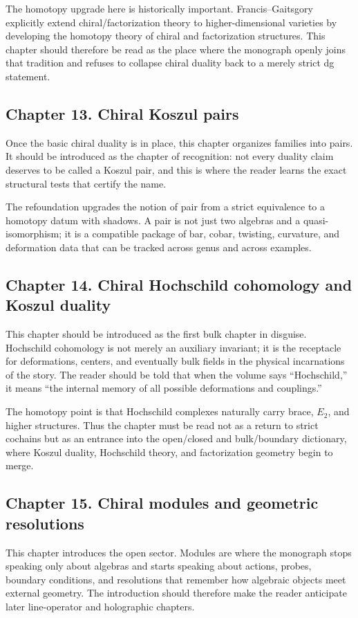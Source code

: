 The homotopy upgrade here is historically important.  Francis--Gaitsgory explicitly extend chiral/factorization theory to higher-dimensional varieties by developing the homotopy theory of chiral and factorization structures.  This chapter should therefore be read as the place where the monograph openly joins that tradition and refuses to collapse chiral duality back to a merely strict dg statement.

\subsection*{Chapter 13. Chiral Koszul pairs}
Once the basic chiral duality is in place, this chapter organizes families into pairs.  It should be introduced as the chapter of recognition: not every duality claim deserves to be called a Koszul pair, and this is where the reader learns the exact structural tests that certify the name.

The refoundation upgrades the notion of pair from a strict equivalence to a homotopy datum with shadows.  A pair is not just two algebras and a quasi-isomorphism; it is a compatible package of bar, cobar, twisting, curvature, and deformation data that can be tracked across genus and across examples.

\subsection*{Chapter 14. Chiral Hochschild cohomology and Koszul duality}
This chapter should be introduced as the first bulk chapter in disguise.  Hochschild cohomology is not merely an auxiliary invariant; it is the receptacle for deformations, centers, and eventually bulk fields in the physical incarnations of the story.  The reader should be told that when the volume says ``Hochschild,'' it means ``the internal memory of all possible deformations and couplings.''

The homotopy point is that Hochschild complexes naturally carry brace, $E_2$, and higher structures.  Thus the chapter must be read not as a return to strict cochains but as an entrance into the open/closed and bulk/boundary dictionary, where Koszul duality, Hochschild theory, and factorization geometry begin to merge.

\subsection*{Chapter 15. Chiral modules and geometric resolutions}
This chapter introduces the open sector.  Modules are where the monograph stops speaking only about algebras and starts speaking about actions, probes, boundary conditions, and resolutions that remember how algebraic objects meet external geometry.  The introduction should therefore make the reader anticipate later line-operator and holographic chapters.

